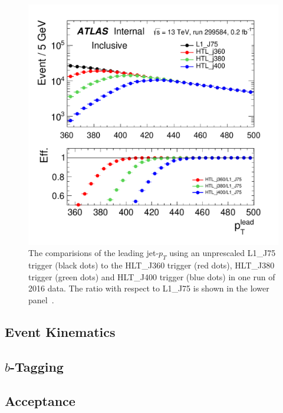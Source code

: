 \begin{figure}[!ht]
  \begin{center}
    \includegraphics[width=0.8\linewidth, angle=0]{figs/Dibjet/ICHEP/evt-jet_pt.pdf}
  \end{center}
\caption[The comparisions of the leading jet-$p_T$ using unprescaled L1\_J75 trigger (black dots) to the HLT\_J360 trigger (red dots),
  HLT\_J380 trigger (green dots) and HLT\_J400 trigger (blue dots) in one run of 2016 data.
  The ratio with respect to L1\_J75 is shown in the lower panel.]
        {The comparisions of the leading jet-$p_T$ using an unprescaled L1\_J75 trigger (black dots) to the HLT\_J360 trigger (red dots),
          HLT\_J380 trigger (green dots) and HLT\_J400 trigger (blue dots) in one run of 2016 data.
          The ratio with respect to L1\_J75 is shown in the lower panel~\cite{dibjet-ichep_conf}.}
  \label{fig:evt-jet_pt}
\end{figure}

\subsection{Event Kinematics}
\label{sec:evt-sel-event}

\subsection{$b$-Tagging}
\label{sec:evt-sel-btag}

\subsection{Acceptance}
\label{sec:evt-sel-acc}

